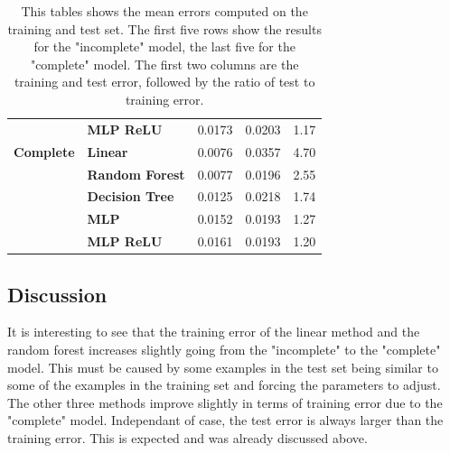\begin{table}[]
\begin{tabular}{l|l|l|l|l|}
\textbf{}           & \textbf{MLP ReLU}      & 0.0173                                                                 & 0.0203                                                             & 1.17                                                                \\ \cline{2-5}
\textbf{Complete}   & \textbf{Linear}        & 0.0076                                                                 & 0.0357                                                             & 4.70                                                                \\ \cline{2-5}
\textbf{}           & \textbf{Random Forest} & 0.0077                                                                 & 0.0196                                                             & 2.55                                                                \\ \cline{2-5}
\textbf{}           & \textbf{Decision Tree} & 0.0125                                                                 & 0.0218                                                             & 1.74                                                                \\ \cline{2-5}
\textbf{}           & \textbf{MLP}           & 0.0152                                                                 & 0.0193                                                             & 1.27                                                                \\ \cline{2-5}
\textbf{}           & \textbf{MLP ReLU}      & 0.0161                                                                 & 0.0193                                                             & 1.20                                                                \\ \cline{2-5}
\end{tabular}
\caption[Learnt mapping results]{This tables shows the mean errors computed on the training and test set. The first five rows show the results for the "incomplete" model, the last five for the "complete" model. The first two columns are the training and test error, followed by the ratio of test to training error.}
\end{table}

\subsection{Discussion}
It is interesting to see that the training error of the linear method and the random forest increases slightly going from the "incomplete" to the "complete" model. This must be caused by some examples in the test set being similar to some of the examples in the training set and forcing the parameters to adjust. The other three methods improve slightly in terms of training error due to the "complete" model. Independant of case, the test error is always larger than the training error. This is expected and was already discussed above.\\

